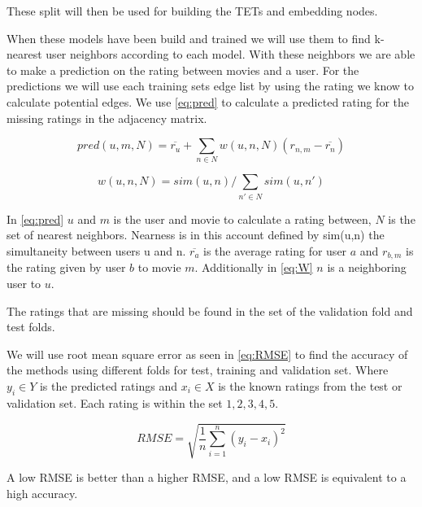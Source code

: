 These split will then be used for building the TETs and embedding nodes.

When these models have been build and trained we will use them to find k-nearest user neighbors according to each model.
With these neighbors we are able to make a prediction on the rating between movies and a user.
For the predictions we will use each training sets edge list by using the rating we know to calculate potential edges. 
We use \autoref{eq:pred} to calculate a predicted rating for the missing ratings in the adjacency matrix.

\begin{equation}\label{eq:pred}
pred(u,m,N) = \overline{r_u}+\sum_{n \in N}w(u,n, N)(r_{n,m}-\overline{r_n})
\end{equation}

\begin{equation}\label{eq:W}
w(u,n, N)=sim(u,n)/\sum_{n' \in N} sim(u,n')
\end{equation}

In \autoref{eq:pred} $u$ and $m$ is the user and movie to calculate a rating between, $N$ is the set of nearest neighbors.
Nearness is in this account defined by sim(u,n) the simultaneity between users u and n.
$\overline{r_a}$ is the average rating for user $a$ and $r_{b,m}$ is the rating given by user $b$ to movie $m$.
Additionally in \autoref{eq:W} $n$ is a neighboring user to $u$.

The ratings that are missing should be found in the set of the validation fold and test folds.

We will use root mean square error as seen in  \autoref{eq:RMSE}\cite{chai2014root} to find the accuracy of the methods using different folds for test, training and validation set.
Where $y_i \in Y$ is the predicted ratings and $x_i \in X$ is the known ratings from the test or validation set. Each rating is within the set ${1,2,3,4,5}$.

\begin{equation}\label{eq:RMSE}
RMSE = \sqrt{\frac{1}{n}\sum^n_{i=1}(y_i - x_i)^2}
\end{equation}

A low RMSE is better than a higher RMSE, and a low RMSE is equivalent to a high accuracy.

